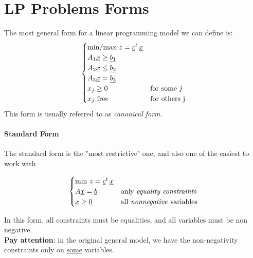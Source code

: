     \section{LP Problems Forms}
        The most general form for a linear programming model we can define is:
        \begin{equation}
            \begin{cases}
                \text{min/max } z = \underline{c}^t\, \underline{x}\\
                A_1\underline{x} \geq \underline{b_1}\\
                A_2\underline{x} \leq \underline{b_2}\\
                A_3\underline{x} = \underline{b_3}\\
                x_j \geq 0 &\text{for some \emph{j}}\\
                x_j \text{ free} & \text{for others j}
            \end{cases}
        \end{equation}
        This form is usually referred to as \textit{canonical form}.

        \paragraph{Standard Form}
            The standard form is the "most restrictive" one, and also one of the easiest to work with
            \begin{definition}
                \begin{equation}
                    \begin{cases}
                        \text{min } z = \underline{c}^t\, \underline{x}\\
                        A\underline{x} = \underline{b} & \text{only \emph{equality constraints}}\\
                        \underline{x} \geq \underline{0} & \text{all \emph{nonnegative} variables}
                    \end{cases}
                \end{equation}
            \end{definition}
            In this form, all constraints must be equalities, and all variables must be non negative.\\
            \textbf{Pay attention}: in the original general model, we have the non-negativity constraints only on \underline{some} variables.

